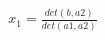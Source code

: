 \documentclass[preview]{standalone}
\begin{document}
\begin{align*}
x_1 = \frac{det(b, a2)}{det(a1, a2)}
\end{align*}
\end{document}
